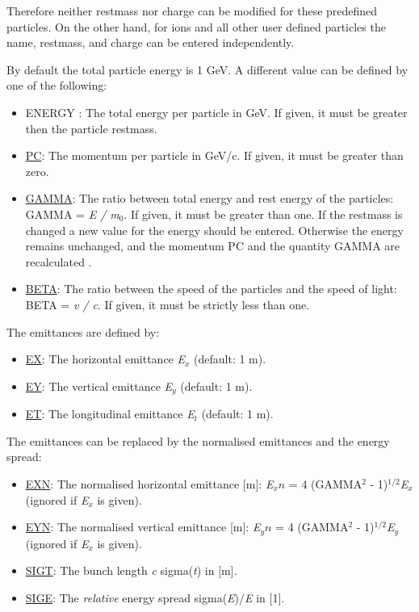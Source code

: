 Therefore neither restmass nor charge can be modified for these
predefined particles. On the other hand, for ions and all other user
defined particles the name, restmass, and charge can be entered
independently.  

By default the total particle energy is 1 GeV. A different value can be 
defined by one of the following: 
 
\begin{itemize}
   \item ENERGY \label{beam_energy}: The total energy per particle in
     GeV. If given, it must be greater then the particle restmass.  
   \item \href{pc}{PC}: The momentum per particle in GeV/c. If
     given, it must be greater than zero.  
   \item \href{gamma}{GAMMA}: The ratio between total energy and
     rest energy of the particles: GAMMA = \textit{E / m$_0$}. If
     given, it must be greater than one. If the restmass is changed
     a new value for the energy should be entered. Otherwise the
     energy remains unchanged, and the momentum PC and the quantity
     GAMMA are recalculated . 
   \item \href{beta}{BETA}: The ratio between the speed of the particles
     and the speed of light: BETA = \textit{v / c}. If
     given, it must be strictly less than one.
\end{itemize}  

The emittances are defined by: 
\begin{itemize}
   \item \href{ex}{EX}: The horizontal emittance \textit{E$_x$} (default: 1 m). 
   \item \href{ey}{EY}: The vertical emittance \textit{E$_y$} (default: 1 m). 
   \item \href{et}{ET}: The longitudinal emittance \textit{E$_t$} (default: 1 m). 
\end{itemize}  

The emittances can be replaced by the normalised emittances and the
energy spread:  
\begin{itemize}
   \item \href{exn}{EXN}: The normalised horizontal emittance [m]:
     \textit{E$_xn$} = 4 (GAMMA$^2$ - 1)$^{1/2}$\textit{E$_x$} (ignored
     if \textit{E$_x$} is given).  
   \item \href{eyn}{EYN}: The normalised vertical emittance [m]:
     \textit{E$_yn$} = 4 (GAMMA$^2$ - 1)$^{1/2}$\textit{E$_y$} (ignored
     if \textit{E$_x$} is given).  
   \item \href{sigt}{SIGT}: The bunch length \textit{c}
     sigma(\textit{t}) in [m].  
   \item \href{sige}{SIGE}: The \emph{relative} energy spread
     sigma(\textit{E})/\textit{E} in [1].  
\end{itemize} 

